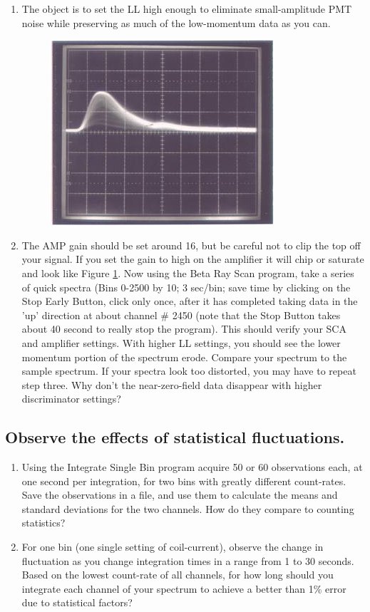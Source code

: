 \documentclass{../lab}
\begin{document}
\begin{enumerate}
    \item The object is to set the LL high enough to eliminate small-amplitude PMT noise while preserving as much of the low-momentum data as you can.

    \begin{figure}[h]
        \centering
        \href{http://experimentationlab.berkeley.edu/sites/default/files/images/BRAimage017.jpg}{\includegraphics[width=0.45\linewidth]{images/BRAimage017.jpg}}
        \caption{}
        \label{fig:Signal3}
    \end{figure}

    \item The AMP gain should be set around 16, but be careful not to clip the top off your signal. If you set the gain to high on the amplifier it will chip or saturate and look like Figure \ref{fig:Signal3}. Now using the Beta Ray Scan program, take a series of quick spectra (Bins 0-2500 by 10; 3 sec/bin; save time by clicking on the Stop Early Button, click only once, after it has completed taking data in the 'up' direction at about channel \# 2450 (note that the Stop Button takes about 40 second to really stop the program). This should verify your SCA and amplifier settings. With higher LL settings, you should see the lower momentum portion of the spectrum erode. Compare your spectrum to the sample spectrum. If your spectra look too distorted, you may have to repeat step three. Why don't the near-zero-field data disappear with higher discriminator settings?
\end{enumerate}

\subsection{Observe the effects of statistical fluctuations.}

\begin{enumerate}
    \item Using the Integrate Single Bin program acquire 50 or 60 observations each, at one second per integration, for two bins with greatly different count-rates. Save the observations in a file, and use them to calculate the means and standard deviations for the two channels. How do they compare to counting statistics?

    \item For one bin (one single setting of coil-current), observe the change in fluctuation as you change integration times in a range from 1 to 30 seconds. Based on the lowest count-rate of all channels, for how long should you integrate each channel of your spectrum to achieve a better than 1\% error due to statistical factors?
\end{enumerate}
\end{document}
